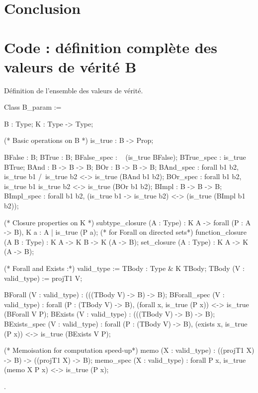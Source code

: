 \documentclass{article}
\theoremstyle{definition}
\begin{document}
\section*{Conclusion}





\newpage

\appendix

\section{Code : définition complète des valeurs de vérité B}
\label{annexe}

Définition de l'ensemble des valeurs de vérité.
\begin{coq}
Class B_param := { B : Type;
  K : Type -> Type;
  
  (* Basic operations on B *)
  is_true : B -> Prop;
  
  BFalse : B;
  BTrue : B;
  BFalse_spec : ~ (is_true BFalse);
  BTrue_spec : is_true BTrue;
  BAnd : B -> B -> B;
  BOr : B -> B -> B;
  BAnd_spec : forall b1 b2, is_true b1 /\ is_true b2 <-> is_true (BAnd b1 b2);
  BOr_spec : forall b1 b2, is_true b1 \/ is_true b2 <-> is_true (BOr b1 b2);
  BImpl : B -> B -> B;
  BImpl_spec : forall b1 b2, (is_true b1 -> is_true b2) <-> (is_true (BImpl b1 b2));
  
  (* Closure properties on K *)
  subtype_closure (A : Type) : K A -> forall (P : A -> B), K {a : A | is_true (P a)}; (* for Forall on directed sets*)
  function_closure (A B : Type) : K A -> K B -> K (A -> B);
  set_closure (A : Type) : K A -> K (A -> B);

  (* Forall and Exists :*)
  valid_type := { TBody : Type & K TBody};
  TBody (V : valid_type) := projT1 V;
  
  BForall (V : valid_type) : (((TBody V) -> B) -> B);
  BForall_spec (V : valid_type) : forall (P : (TBody V) -> B), 
    (forall x, is_true (P x)) <-> is_true (BForall V P);
  BExists (V : valid_type) : (((TBody V) -> B) -> B);
  BExists_spec (V : valid_type) : forall (P : (TBody V) -> B), 
    (exists x, is_true (P x)) <-> is_true (BExists V P);
  
  
  (* Memoisation for computation speed-up*)
  memo (X : valid_type) : ((projT1 X) -> B) -> ((projT1 X) -> B);
  memo_spec (X : valid_type) : forall P x, is_true (memo X P x) <-> is_true (P x);
  }.
\end{coq}
\end{document}
